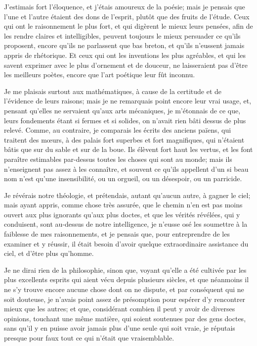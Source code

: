 \documentclass[french,twoside]{book} %
\begin{document}
J'estimais fort l'éloquence, et j'étais amoureux de la poésie; mais je pensais que l'une et l'autre étaient des dons de l'esprit, plutôt que des fruits de l'étude. Ceux qui ont le raisonnement le plus fort, et qui digèrent le mieux leurs pensées, afin de les rendre claires et intelligibles, peuvent toujours le mieux persuader ce qu'ils proposent, encore qu'ils ne parlassent que bas breton, et qu'ils n'eussent jamais appris de rhétorique. Et ceux qui ont les inventions les plus agréables, et qui les savent exprimer avec le plus d'ornement et de douceur, ne laisseraient pas d'être les meilleurs poètes, encore que l'art poétique leur fût inconnu.\par
Je me plaisais surtout aux mathématiques, à cause de la certitude et de l'évidence de leurs raisons; mais je ne remarquais point encore leur vrai usage, et, pensant qu'elles ne servaient qu'aux arts mécaniques, je m'étonnais de ce que, leurs fondements étant si fermes et si solides, on n'avait rien bâti dessus de plus relevé. Comme, au contraire, je comparais les écrits des anciens païens, qui traitent des mœurs, à des palais fort superbes et fort magnifiques, qui n'étaient bâtis que sur du sable et sur de la boue. Ils élèvent fort haut les vertus, et les font paraître estimables par-dessus toutes les choses qui sont au monde; mais ils n'enseignent pas assez à les connaître, et souvent ce qu'ils appellent d'un si beau nom n'est qu'une insensibilité, ou un orgueil, ou un désespoir, ou un parricide.\par
Je révérais notre théologie, et prétendais, autant qu'aucun autre, à gagner le ciel; mais ayant appris, comme chose très assurée, que le chemin n'en est pas moins ouvert aux plus ignorants qu'aux plus doctes, et que les vérités révélées, qui y conduisent, sont au-dessus de notre intelligence, je n'eusse osé les soumettre à la faiblesse de mes raisonnements, et je pensais que, pour entreprendre de les examiner et y réussir, il était besoin d'avoir quelque extraordinaire assistance du ciel, et d'être plus qu'homme.\par
Je ne dirai rien de la philosophie, sinon que, voyant qu'elle a été cultivée par les plus excellents esprits qui aient vécu depuis plusieurs siècles, et que néanmoins il ne s'y trouve encore aucune chose dont on ne dispute, et par conséquent qui ne soit douteuse, je n'avais point assez de présomption pour espérer d'y rencontrer mieux que les autres; et que, considérant combien il peut y avoir de diverses opinions, touchant une même matière, qui soient soutenues par des gens doctes, sans qu'il y en puisse avoir jamais plus d'une seule qui soit vraie, je réputais presque pour faux tout ce qui n'était que vraisemblable.\par
\end{document}
